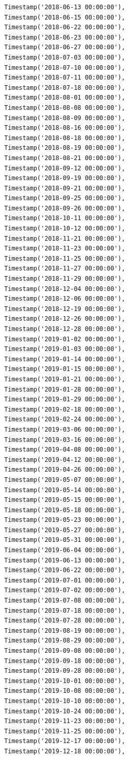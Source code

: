 \begin{verbatim}
 Timestamp('2018-06-13 00:00:00'),
 Timestamp('2018-06-15 00:00:00'),
 Timestamp('2018-06-22 00:00:00'),
 Timestamp('2018-06-23 00:00:00'),
 Timestamp('2018-06-27 00:00:00'),
 Timestamp('2018-07-03 00:00:00'),
 Timestamp('2018-07-10 00:00:00'),
 Timestamp('2018-07-11 00:00:00'),
 Timestamp('2018-07-18 00:00:00'),
 Timestamp('2018-08-01 00:00:00'),
 Timestamp('2018-08-08 00:00:00'),
 Timestamp('2018-08-09 00:00:00'),
 Timestamp('2018-08-16 00:00:00'),
 Timestamp('2018-08-18 00:00:00'),
 Timestamp('2018-08-19 00:00:00'),
 Timestamp('2018-08-21 00:00:00'),
 Timestamp('2018-09-12 00:00:00'),
 Timestamp('2018-09-19 00:00:00'),
 Timestamp('2018-09-21 00:00:00'),
 Timestamp('2018-09-25 00:00:00'),
 Timestamp('2018-09-26 00:00:00'),
 Timestamp('2018-10-11 00:00:00'),
 Timestamp('2018-10-12 00:00:00'),
 Timestamp('2018-11-21 00:00:00'),
 Timestamp('2018-11-23 00:00:00'),
 Timestamp('2018-11-25 00:00:00'),
 Timestamp('2018-11-27 00:00:00'),
 Timestamp('2018-11-29 00:00:00'),
 Timestamp('2018-12-04 00:00:00'),
 Timestamp('2018-12-06 00:00:00'),
 Timestamp('2018-12-19 00:00:00'),
 Timestamp('2018-12-26 00:00:00'),
 Timestamp('2018-12-28 00:00:00'),
 Timestamp('2019-01-02 00:00:00'),
 Timestamp('2019-01-03 00:00:00'),
 Timestamp('2019-01-14 00:00:00'),
 Timestamp('2019-01-15 00:00:00'),
 Timestamp('2019-01-21 00:00:00'),
 Timestamp('2019-01-28 00:00:00'),
 Timestamp('2019-01-29 00:00:00'),
 Timestamp('2019-02-18 00:00:00'),
 Timestamp('2019-02-24 00:00:00'),
 Timestamp('2019-03-06 00:00:00'),
 Timestamp('2019-03-16 00:00:00'),
 Timestamp('2019-04-08 00:00:00'),
 Timestamp('2019-04-12 00:00:00'),
 Timestamp('2019-04-26 00:00:00'),
 Timestamp('2019-05-07 00:00:00'),
 Timestamp('2019-05-14 00:00:00'),
 Timestamp('2019-05-15 00:00:00'),
 Timestamp('2019-05-18 00:00:00'),
 Timestamp('2019-05-23 00:00:00'),
 Timestamp('2019-05-27 00:00:00'),
 Timestamp('2019-05-31 00:00:00'),
 Timestamp('2019-06-04 00:00:00'),
 Timestamp('2019-06-13 00:00:00'),
 Timestamp('2019-06-22 00:00:00'),
 Timestamp('2019-07-01 00:00:00'),
 Timestamp('2019-07-02 00:00:00'),
 Timestamp('2019-07-08 00:00:00'),
 Timestamp('2019-07-18 00:00:00'),
 Timestamp('2019-07-28 00:00:00'),
 Timestamp('2019-08-19 00:00:00'),
 Timestamp('2019-08-29 00:00:00'),
 Timestamp('2019-09-08 00:00:00'),
 Timestamp('2019-09-18 00:00:00'),
 Timestamp('2019-09-28 00:00:00'),
 Timestamp('2019-10-01 00:00:00'),
 Timestamp('2019-10-08 00:00:00'),
 Timestamp('2019-10-10 00:00:00'),
 Timestamp('2019-10-24 00:00:00'),
 Timestamp('2019-11-23 00:00:00'),
 Timestamp('2019-11-25 00:00:00'),
 Timestamp('2019-12-17 00:00:00'),
 Timestamp('2019-12-18 00:00:00'),

\end{verbatim}
